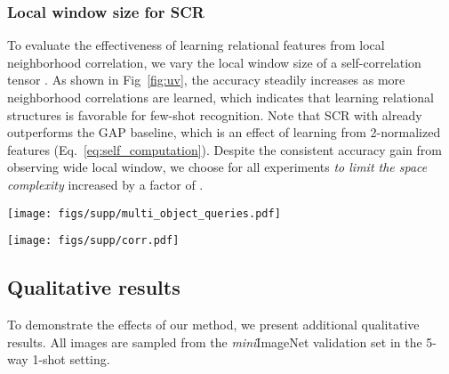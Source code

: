 \documentclass[10pt,twocolumn,letterpaper]{article}
\newcommand{\itmini}{\textit{mini}}
\newcommand{\abbself}{SCR\xspace}
\newcommand{\abbcross}{CCA\xspace}
\begin{document}
\subsubsection{Local window size  for \abbself}
To evaluate the effectiveness of learning relational features from local neighborhood correlation, we vary the local window size  of a self-correlation tensor .
As shown in Fig~\ref{fig:uv}, the accuracy steadily increases as more neighborhood correlations are learned, which indicates that learning relational structures is favorable for few-shot recognition.
Note that \abbself with  already outperforms the GAP baseline, which is an effect of learning from 2-normalized features (Eq.~\ref{eq:self_computation}).
Despite the consistent accuracy gain from observing wide local window, we choose  for all experiments \textit{to limit the space complexity} increased by a factor of .








\begin{figure*}[t!]
\centering
\texttt{[image: figs/supp/multi\_object\_queries.pdf]}
\caption{\textbf{Co-attention maps on multi-object queries on \itmini ImageNet}.
The proposed \abbcross module can adaptively capture multiple objects in a query depending on the context of each support instance. 
\label{fig:multi_object_queries}}
\end{figure*} 








\begin{figure*}[t!]
\centering
\texttt{[image: figs/supp/corr.pdf]}
\caption{\textbf{Visualization of cross-correlation on \itmini ImageNet}.
\textbf{(a)}: Top 10 matches in  (initial cross-correlation). \textbf{(b)}: Top 10 matches in  (refined cross-correlation).
Unreliable matches are filtered through .
\label{fig:corr}}
\end{figure*} 








\subsection{Qualitative results}
To demonstrate the effects of our method, we present additional qualitative results.
All images are sampled from the \itmini ImageNet validation set in the 5-way 1-shot setting.
\end{document}

